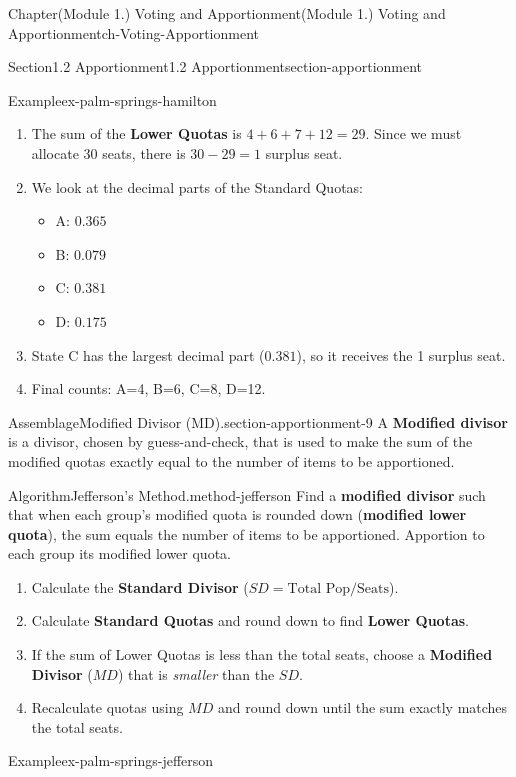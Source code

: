 \documentclass[oneside,10pt,]{book}
\newcommand{\ptxlistdisc}{\raisebox{0.3ex}{\textbullet}}
\newcommand{\terminology}[1]{\textbf{#1}}
\begin{document}
\begin{chapterptx}{Chapter}{(Module 1.) Voting and Apportionment}{}{(Module 1.) Voting and Apportionment}{}{}{ch-Voting-Apportionment}
\begin{sectionptx}{Section}{1.2 Apportionment}{}{1.2 Apportionment}{}{}{section-apportionment}
\begin{example}{Example}{}{ex-palm-springs-hamilton}
\begin{enumerate}
\item{}The sum of the \terminology{Lower Quotas} is \(4 + 6 + 7 + 12 = 29\). Since we must allocate 30 seats, there is \(30 - 29 = 1\) surplus seat.%
\item{}We look at the decimal parts of the Standard Quotas:%
\begin{itemize}[label=\ptxlistdisc]
\item{}A: \(0.365\)%
\item{}B: \(0.079\)%
\item{}C: \(0.381\)%
\item{}D: \(0.175\)%
\end{itemize}
%
\item{}State C has the largest decimal part (\(0.381\)), so it receives the 1 surplus seat.%
\item{}Final counts: A=4, B=6, C=8, D=12.%
\end{enumerate}
%
\end{example}
\begin{assemblage}{Assemblage}{Modified Divisor (MD).}{section-apportionment-9}%
A \terminology{Modified divisor} is a divisor, chosen by guess-and-check, that is used to make the sum of the modified quotas exactly equal to the number of items to be apportioned.%
\end{assemblage}
\begin{algorithm}{Algorithm}{Jefferson's Method.}{}{method-jefferson}%
Find a \terminology{modified divisor} such that when each group's modified quota is rounded down (\terminology{modified lower quota}), the sum equals the number of items to be apportioned. Apportion to each group its modified lower quota.%
%
\begin{enumerate}
\item{}Calculate the \terminology{Standard Divisor} (\(SD = \text{Total Pop} / \text{Seats}\)).%
\item{}Calculate \terminology{Standard Quotas} and round down to find \terminology{Lower Quotas}.%
\item{}If the sum of Lower Quotas is less than the total seats, choose a \terminology{Modified Divisor} (\(MD\)) that is \emph{smaller} than the \(SD\).%
\item{}Recalculate quotas using \(MD\) and round down until the sum exactly matches the total seats.%
\end{enumerate}
\end{algorithm}
\begin{example}{Example}{}{ex-palm-springs-jefferson}%

\end{example}
\end{sectionptx}
\end{chapterptx}
\end{document}
